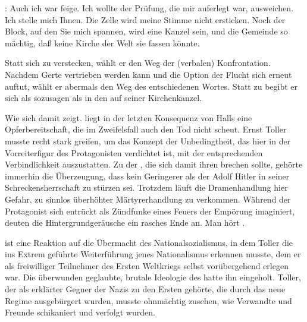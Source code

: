 \begin{BlockQuote}
: Auch ich war feige. Ich wollte der Prüfung, die mir
auferlegt war, ausweichen. Ich stelle mich Ihnen. Die Zelle wird meine Stimme
nicht ersticken. Noch der Block, auf den Sie mich spannen, wird eine Kanzel
sein, und die Gemeinde so mächtig, daß keine Kirche der Welt sie fassen
könnte. 
\end{BlockQuote}
Statt sich zu verstecken, wählt er den Weg der (verbalen)
Konfrontation. Nachdem Gerte vertrieben werden kann und die Option der Flucht
sich erneut auftut, wählt er abermals den Weg des entschiedenen Wortes. Statt zu
\Cite{desertieren} 
begibt er sich als sozusagen als 
in den  auf seiner Kirchenkanzel.

Wie sich damit zeigt. liegt in der letzten Konsequenz von Halls \Cite{Weg der
  Wahrheit} eine Opferbereitschaft, die im Zweifelsfall auch den Tod nicht
scheut. Ernst Toller musste recht stark \Cite{ins Register der Märtyrerkonventionen
und Christusstilisierungen} greifen, um das Konzept der
Unbedingtheit, das hier in der Vorreiterfigur des Protagonisten verdichtet
ist, mit der entsprechenden Verbindlichkeit auszustatten. Zu der
\Cite{Wahrheit}, die sich damit ihren \Cite{Weg} brechen sollte, gehörte immerhin die
Überzeugung, dass kein Geringerer als der \Cite{Antichrist}
   Adolf Hitler in
seiner Schreckensherrschaft zu stürzen sei. 
Trotzdem läuft die Dramenhandlung hier Gefahr, zu sinnlos überhöhter
Märtyrerhandlung zu verkommen. Während der Protagonist sich entrückt als
Zündfunke eines Feuers der Empörung imaginiert, deuten die
Hintergrundgeräusche ein rasches Ende an. Man hört \Cite{den Marschtritt einer
  sich nähernden Kolonne. Stärker. Drohender.} .


 ist eine Reaktion auf die Übermacht des
Nationalsozialismus, in dem Toller die ins Extrem geführte Weiterführung jenes
Nationalismus erkennen musste, dem er als freiwilliger Teilnehmer des
Ersten Weltkriegs selbst vorübergehend erlegen war. Die überwunden geglaubte,
brutale Ideologie des \Cite{Vaterlandes} hatte ihn eingeholt. Toller, der als
erklärter Gegner der Nazis zu den Ersten gehörte, die durch das neue Regime
ausgebürgert wurden, musste ohnmächtig zusehen, wie Verwandte und Freunde
schikaniert und verfolgt wurden.

